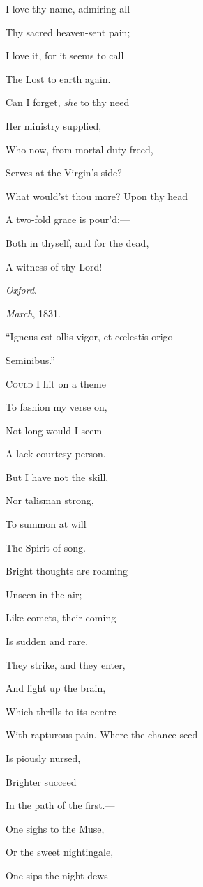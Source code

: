 I love thy name, admiring all

Thy sacred heaven-sent pain;

I love it, for it seems to call

The Lost to earth again.

Can I forget, \emph{she} to thy need

Her ministry supplied,

Who now, from mortal duty freed,

Serves at the Virgin's side? 

What would'st thou more? Upon thy head

A two-fold grace is pour'd;—

Both in thyself, and for the dead,

A witness of thy Lord!

\emph{Oxford}.

\emph{March}, 1831.


``Igneus est ollis vigor, et cœlestis origo

Seminibus.''

C\textsc{ould} I hit on a theme

To fashion my verse on,

Not long would I seem

A lack-courtesy person.

But I have not the skill,

Nor talisman strong,

To summon at will

The Spirit of song.—

Bright thoughts are roaming

Unseen in the air;

Like comets, their coming

Is sudden and rare.

They strike, and they enter,

And light up the brain,

Which thrills to its centre

With rapturous pain. Where the chance-seed

Is piously nursed,

Brighter succeed

In the path of the first.—

One sighs to the Muse,

Or the sweet nightingale,

One sips the night-dews

